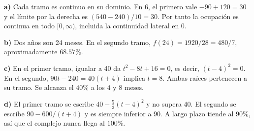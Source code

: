 \textbf{a)} Cada tramo es continuo en su dominio.
En $6$, el primero vale $-90+120=30$ y el límite por la derecha
es $(540-240)/10=30$. Por tanto la ocupación es continua
en todo $[0,\infty)$, incluida la continuidad lateral en $0$.

\textbf{b)} Dos años son 24 meses. En el segundo tramo,
$f(24)=1920/28=480/7$, aproximadamente $\boxed{68.57\%}$.

\textbf{c)} En el primer tramo, igualar a 40 da
$t^2-8t+16=0$, es decir, $(t-4)^2=0$.
En el segundo, $90t-240=40(t+4)$ implica $t=8$.
Ambas raíces pertenecen a su tramo. Se alcanza el $40\%$
a los $\boxed{4\text{ y }8\text{ meses}}$.

\textbf{d)} El primer tramo se escribe $40-\frac52(t-4)^2$
y no supera 40. El segundo se escribe $90-600/(t+4)$
y es siempre inferior a 90. A largo plazo tiende al $90\%$,
así que el complejo nunca llega al $100\%$.
